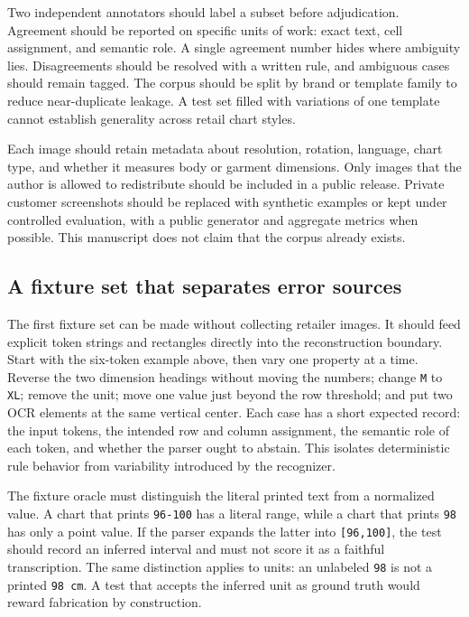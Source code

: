\documentclass[10pt,letterpaper]{article}
\begin{document}
Two independent annotators should label a subset before adjudication. Agreement should be reported on specific units of work: exact text, cell assignment, and semantic role. A single agreement number hides where ambiguity lies. Disagreements should be resolved with a written rule, and ambiguous cases should remain tagged. The corpus should be split by brand or template family to reduce near-duplicate leakage. A test set filled with variations of one template cannot establish generality across retail chart styles.

Each image should retain metadata about resolution, rotation, language, chart type, and whether it measures body or garment dimensions. Only images that the author is allowed to redistribute should be included in a public release. Private customer screenshots should be replaced with synthetic examples or kept under controlled evaluation, with a public generator and aggregate metrics when possible. This manuscript does not claim that the corpus already exists.

\subsection{A fixture set that separates error sources}

The first fixture set can be made without collecting retailer images. It should feed explicit token strings and rectangles directly into the reconstruction boundary. Start with the six-token example above, then vary one property at a time. Reverse the two dimension headings without moving the numbers; change \texttt{M} to \texttt{XL}; remove the unit; move one value just beyond the row threshold; and put two OCR elements at the same vertical center. Each case has a short expected record: the input tokens, the intended row and column assignment, the semantic role of each token, and whether the parser ought to abstain. This isolates deterministic rule behavior from variability introduced by the recognizer.

The fixture oracle must distinguish the literal printed text from a normalized value. A chart that prints \texttt{96-100} has a literal range, while a chart that prints \texttt{98} has only a point value. If the parser expands the latter into \texttt{[96,100]}, the test should record an inferred interval and must not score it as a faithful transcription. The same distinction applies to units: an unlabeled \texttt{98} is not a printed \texttt{98 cm}. A test that accepts the inferred unit as ground truth would reward fabrication by construction.
\end{document}
